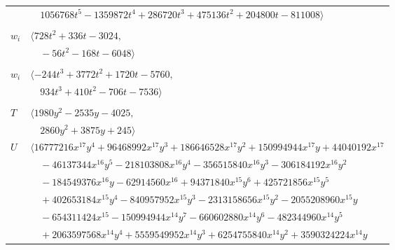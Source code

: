 \documentclass[11pt]{article}
\begin{document}
\begin{longtable}{@{}ll@{}}
 & $\quad 1056768t^{5}-1359872t^{4}+286720t^{3}+475136t^{2}+204800t-811008\rangle$\\
\addlinespace[2pt]
\multicolumn{2}{@{}p{0.97\textwidth}@{}}{$i=62$, $D_i=2$, $\rho_{ij}$: $2{:}2, \allowbreak 16{:}1, \allowbreak 18{:}2, \allowbreak 23{:}2, \allowbreak 25{:}1, \allowbreak 26{:}2, \allowbreak 31{:}1, \allowbreak 36{:}2, \allowbreak 47{:}2, \allowbreak 49{:}2, \allowbreak 58{:}1$}\\
$w_i$ & $\langle 728t^{2}+336t-3024,$\\
 & $\quad -56t^{2}-168t-6048\rangle$\\
\addlinespace[2pt]
\multicolumn{2}{@{}p{0.97\textwidth}@{}}{$i=63$, $D_i=8$, $\rho_{ij}$: $3{:}1, \allowbreak 8{:}1, \allowbreak 16{:}1, \allowbreak 18{:}1, \allowbreak 22{:}1, \allowbreak 24{:}2, \allowbreak 27{:}2, \allowbreak 30{:}2, \allowbreak 40{:}2, \allowbreak 43{:}1, \allowbreak 45{:}2, \allowbreak 54{:}2, \allowbreak 55{:}2, \allowbreak 58{:}1, \allowbreak 61{:}2, \allowbreak 64{:}1$}\\
$w_i$ & $\langle -244t^{3}+3772t^{2}+1720t-5760,$\\
 & $\quad 934t^{3}+410t^{2}-706t-7536\rangle$\\
\addlinespace[2pt]
\multicolumn{2}{@{}p{0.97\textwidth}@{}}{$i=64$, $D_i=128$, $\rho_{ij}$: $2{:}2, \allowbreak 13{:}1, \allowbreak 14{:}2, \allowbreak 15{:}1, \allowbreak 16{:}2, \allowbreak 17{:}2, \allowbreak 22{:}2, \allowbreak 24{:}1, \allowbreak 26{:}2, \allowbreak 29{:}2, \allowbreak 37{:}1, \allowbreak 55{:}2, \allowbreak 63{:}2, \allowbreak 66{:}1, \allowbreak 67{:}1$}\\
$T$ & $\langle 1980y^{2}-2535y-4025,$\\
 & $\quad 2860y^{2}+3875y+245\rangle$\\
$U$ & $\langle 16777216x^{17}y^{4}+96468992x^{17}y^{3}+186646528x^{17}y^{2}+150994944x^{17}y+44040192x^{17}$\\
 & $\quad -46137344x^{16}y^{5}-218103808x^{16}y^{4}-356515840x^{16}y^{3}-306184192x^{16}y^{2}$\\
 & $\quad -184549376x^{16}y-62914560x^{16}+94371840x^{15}y^{6}+425721856x^{15}y^{5}$\\
 & $\quad +402653184x^{15}y^{4}-840957952x^{15}y^{3}-2313158656x^{15}y^{2}-2055208960x^{15}y$\\
 & $\quad -654311424x^{15}-150994944x^{14}y^{7}-660602880x^{14}y^{6}-482344960x^{14}y^{5}$\\
 & $\quad +2063597568x^{14}y^{4}+5559549952x^{14}y^{3}+6254755840x^{14}y^{2}+3590324224x^{14}y$\\

\end{longtable}
\end{document}
